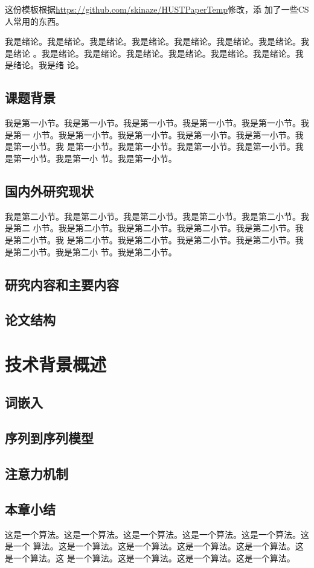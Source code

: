 \documentclass[supercite]{HustGraduPaper}
\theoremstyle{definition}
\begin{document}
这份模板根据\url{https://github.com/skinaze/HUSTPaperTemp}\cite{ski17}修改，添
加了一些CS人常用的东西。

我是绪论。我是绪论。我是绪论。我是绪论。我是绪论。我是绪论。我是绪论。我是绪论
。我是绪论。我是绪论。我是绪论。我是绪论。我是绪论。我是绪论。我是绪论。我是绪
论。

\subsection{课题背景}

我是第一小节。我是第一小节。我是第一小节。我是第一小节。我是第一小节。我是第一
小节。我是第一小节。我是第一小节。我是第一小节。我是第一小节。我是第一小节。我
是第一小节。我是第一小节。我是第一小节。我是第一小节。我是第一小节。我是第一小
节。我是第一小节。

\subsection{国内外研究现状}

我是第二小节。我是第二小节。我是第二小节。我是第二小节。我是第二小节。我是第二
小节。我是第二小节。我是第二小节。我是第二小节。我是第二小节。我是第二小节。我
是第二小节。我是第二小节。我是第二小节。我是第二小节。我是第二小节。我是第二小
节。我是第二小节。

\subsection{研究内容和主要内容}

\subsection{论文结构}

\section{技术背景概述} 
\subsection{词嵌入}
\subsection{序列到序列模型}
\subsection{注意力机制}
\subsection{本章小结}
这是一个算法。这是一个算法。这是一个算法。这是一个算法。这是一个算法。这是一个
算法。这是一个算法。这是一个算法。这是一个算法。这是一个算法。这是一个算法。这
是一个算法。这是一个算法。这是一个算法。这是一个算法。
\end{document}
